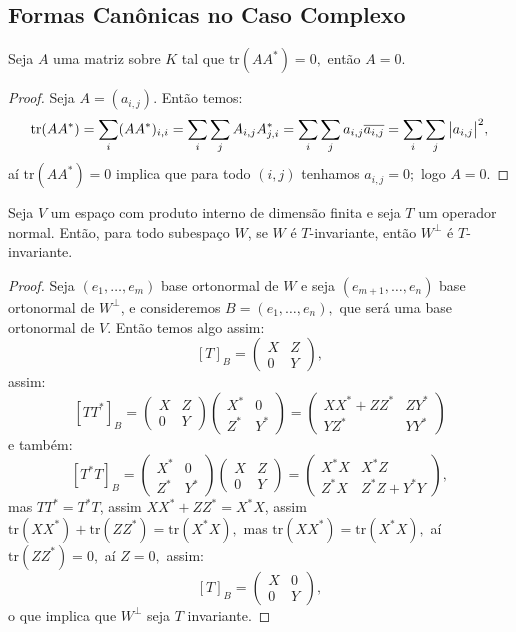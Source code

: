\documentclass[11pt,twoside,a4paper]{book}
\begin{document}
\newpage

\subsection{Formas Canônicas no Caso Complexo}

\begin{proposicao}
Seja $A$ uma matriz sobre $K$ tal que $\mathrm{tr}(AA^*)=0,$ então $A=0$.
\end{proposicao}
\begin{proof}
Seja $A=(a_{i,j})$. Então temos:
\[
\mathrm{tr}(AA^*)=\sum_i(AA^*)_{i,i}=\sum_i\sum_jA_{i,j}A^*_{j,i}=\sum_i\sum_ja_{i,j}\overline{a_{i,j}}=\sum_i\sum_j\abs{a_{i,j}}^2,
\]
aí $\mathrm{tr}(AA^*)=0$ implica que para todo $(i,j)$ tenhamos $a_{i,j}=0;$ logo $A=0.$
\end{proof}

\begin{proposicao}\label{invariante}
Seja $V$ um espaço com produto interno de dimensão finita e seja $T$ um operador normal. Então, para todo subespaço $W$, se $W$ é $T$-invariante, então $W^\perp$ é $T$-invariante.
\end{proposicao}
\begin{proof}
Seja $(e_1,\dots,e_m)$ base ortonormal de $W$ e seja $(e_{m+1},\dots,e_n)$ base ortonormal de $W^\perp$, e consideremos $B=(e_1,\dots,e_n),$ que será uma base ortonormal de $V$. Então temos algo assim:
\[
[T]_B=\begin{pmatrix}
X&Z\\0&Y
\end{pmatrix},
\]
assim:
\[
[TT^*]_B=\begin{pmatrix}
X&Z\\0&Y
\end{pmatrix}\begin{pmatrix}
X^*&0\\Z^*&Y^*
\end{pmatrix}=\begin{pmatrix}
XX^*+ZZ^*&ZY^*\\YZ^*&YY^*
\end{pmatrix}
\]
e também:
\[
[T^*T]_B=\begin{pmatrix}
X^*&0\\Z^*&Y^*
\end{pmatrix}\begin{pmatrix}
X&Z\\0&Y
\end{pmatrix}=\begin{pmatrix}
X^*X&X^*Z\\Z^*X&Z^*Z+Y^*Y
\end{pmatrix},
\]
mas $TT^*=T^*T$, assim $XX^*+ZZ^*=X^*X$, assim $\mathrm{tr}(XX^*)+\mathrm{tr}(ZZ^*)=\mathrm{tr}(X^*X),$ mas $\mathrm{tr}(XX^*)=\mathrm{tr}(X^*X),$ aí $\mathrm{tr}(ZZ^*)=0,$ aí $Z=0,$ assim:
\[
[T]_B=\begin{pmatrix}
X&0\\0&Y
\end{pmatrix},
\]
o que implica que $W^\perp$ seja $T$ invariante.
\end{proof}
\end{document}
